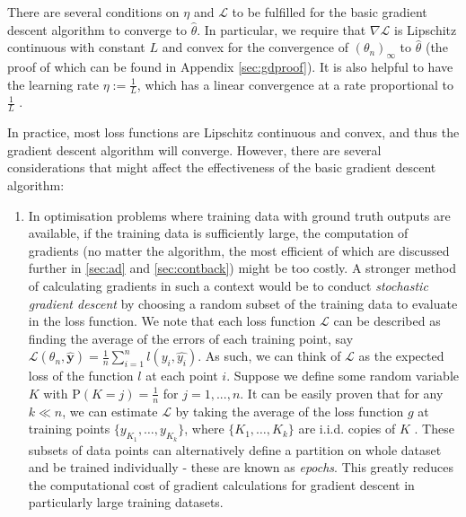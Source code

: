\documentclass[a4paper,11pt,titlepage]{article}
\theoremstyle{definition}
\theoremstyle{plain}
\theoremstyle{remark}
\begin{document}
There are several conditions on $\eta$ and $\mathcal{L}$ to be fulfilled for the basic gradient descent algorithm to converge to $\hat{\theta}$. In particular, we require that $\nabla\mathcal{L}$ is Lipschitz continuous with constant $L$ and convex for the convergence of $(\theta_n)_\infty$ to $\hat{\theta}$ (the proof of which can be found in Appendix \ref{sec:gdproof}). It is also helpful to have the learning rate $\eta := \frac{1}{L}$, which has a linear convergence at a rate proportional to $\frac{1}{L}$ \cite{gower2015}.

In practice, most loss functions are Lipschitz continuous and convex, and thus the gradient descent algorithm will converge. However, there are several considerations that might affect the effectiveness of the basic gradient descent algorithm:
\begin{enumerate}
    \item In optimisation problems where training data with ground truth outputs are available, if the training data is sufficiently large, the computation of gradients (no matter the algorithm, the most efficient of which are discussed further in \ref{sec:ad} and \ref{sec:contback}) might be too costly. A stronger method of calculating gradients in such a context would be to conduct \textit{stochastic gradient descent} by choosing a random subset of the training data to evaluate in the loss function. We note that each loss function $\mathcal{L}$ can be described as finding the average of the errors of each training point, say $\mathcal{L}(\theta_n,\mathbf{\hat{y}}) = \frac{1}{n} \sum_{i=1}^n l(y_i, \hat{y_i})$. As such, we can think of $\mathcal{L}$ as the expected loss of the function $l$ at each point $i$. Suppose we define some random variable $K$ with $\mathrm{P}(K = j) = \frac{1}{n}$ for $j = 1, ..., n$. It can be easily proven that for any $k \ll n$, we can estimate $\mathcal{L}$ by taking the average of the loss function $g$ at training points $\{y_{K_1}, \dots, y_{K_k}\}$, where $\{K_1, \dots, K_k\}$ are i.i.d. copies of $K$ \cite{kroese2019}. These subsets of data points can alternatively define a partition on whole dataset and be trained individually - these are known as \textit{epochs}. This greatly reduces the computational cost of gradient calculations for gradient descent in particularly large training datasets. 
    

\end{enumerate}
\end{document}
